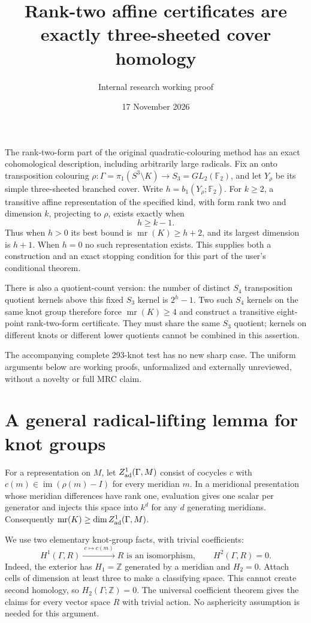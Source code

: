 \documentclass[11pt]{article}
\title{Rank-two affine certificates are exactly three-sheeted cover homology}
\author{Internal research working proof}
\date{17 November 2026}
\newcommand{\F}{\mathbb F}
\newcommand{\Z}{\mathbb Z}
\newcommand{\mr}{\operatorname{mr}}
\newcommand{\im}{\operatorname{im}}
\begin{document}
\maketitle

The rank-two-form part of the original quadratic-colouring method
has an exact cohomological description, including arbitrarily large
radicals. Fix an onto transposition colouring
$\rho:\Gamma=\pi_1(S^3\setminus K)\to S_3=GL_2(\F_2)$, and let
$Y_\rho$ be its simple three-sheeted branched cover. Write
$h=b_1(Y_\rho;\F_2)$. For $k\ge2$, a transitive affine
representation of the specified kind, with form rank two and
dimension $k$, projecting to $\rho$, exists exactly when
\[
                         h\ge k-1.
\]
Thus when $h>0$ its best bound is $\mr(K)\ge h+2$, and its largest
dimension is $h+1$. When $h=0$ no such representation exists.
This supplies both a construction and an exact stopping condition
for this part of the user's conditional theorem.

There is also a quotient-count version: the number of distinct
$S_4$ transposition quotient kernels above this fixed $S_3$ kernel
is $2^h-1$. Two such $S_4$ kernels on the same knot group therefore
force $\mr(K)\ge4$ and construct a transitive eight-point
rank-two-form certificate. They must share the same $S_3$ quotient;
kernels on different knots or different lower quotients cannot be
combined in this assertion.

The accompanying complete 293-knot test has no new sharp case.
The uniform arguments below are working proofs, unformalized and
externally unreviewed, without a novelty or full MRC claim.

\section{A general radical-lifting lemma for knot groups}

For a representation on $M$, let $Z^1_{\rm ad}(\Gamma,M)$ consist
of cocycles $c$ with
$c(m)\in\im(\rho(m)-I)$ for every meridian $m$. In a meridional
presentation whose meridian differences have rank one, evaluation
gives one scalar per generator and injects this space into
$k^d$ for any $d$ generating meridians. Consequently
$\mr(K)\ge\dim Z^1_{\rm ad}(\Gamma,M)$.

We use two elementary knot-group facts, with trivial coefficients:
\[
 H^1(\Gamma,R)\xrightarrow{\ c\mapsto c(m)\ }R\text{ is an
 isomorphism},\qquad H^2(\Gamma,R)=0.
\]
Indeed, the exterior has $H_1=\Z$ generated by a meridian and
$H_2=0$. Attach cells of dimension at least three to make a
classifying space. This cannot create second homology, so
$H_2(\Gamma;\Z)=0$. The universal coefficient theorem gives the
claims for every vector space $R$ with trivial action. No
asphericity assumption is needed for this argument.
\end{document}
